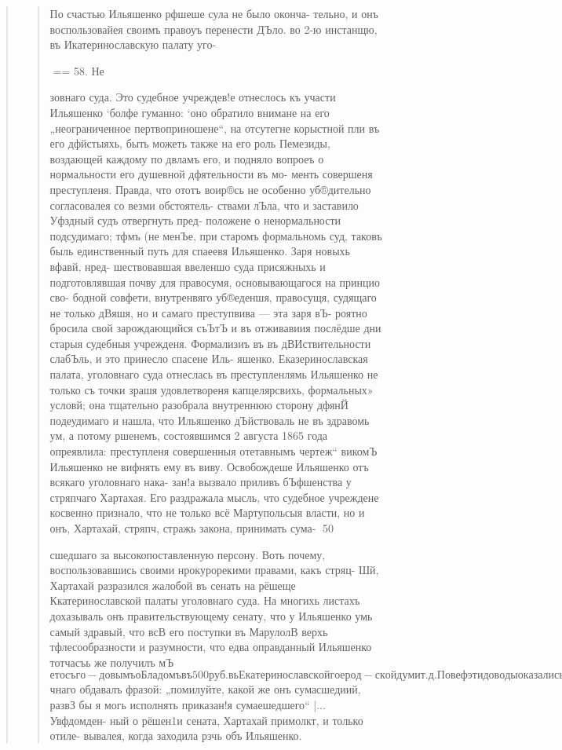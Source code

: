 \begin{quote}
\begin{quote}
По счастью Ильяшенко рфшеше сула не было оконча-
тельно, и онъ воспользовайея своимъ правоуъ перенести
ДЪло. во 2-ю инстанщю, въ Икатеринославскую палату уго-

== 58. Не

зовнаго суда. Это судебное учреждев!е отнеслось къ участи
Ильяшенко ‘болфе гуманно: ‘оно обратило внимане на его
„неограниченное пертвоприношене“, на отсутегне корыстной
пли въ его дфйстыяхь, быть можеть также на его роль
Пемезиды, воздающей каждому по двламъ его, и подняло
вопроеъ о нормальности его душевной дфятельности въ мо-
менть совершеня преступленя. Правда, что ототъ воир®сь
не особенно уб®дительно согласовалея со везми обстоятель-
ствами лЪла, что и заставило Уфздный судъ отвергнуть пред-
положене о ненормальности подсудимаго; тфмъ (не менЪе,
при старомъ формальномь суд, таковъ быль единственный
путь для спаеевя Ильяшенко. Заря новыхь вфавй, нред-
шествовавшая ввеленшо суда присяжныхь и подготовлявшая
почву для правосумя, основывающагося на принцио сво-
бодной совфети, внутренвяго уб®еденшя, правосущя, судящаго
не только дВяшя, но и самаго преступвива — эта заря вЪ-
роятно бросила свой зарождающийся съЪтЪ и въ отживавиия
послёдше дни старыя судебныя учрежденя. Формализиъ въ
въ дВИствительности слабЪль, и это принесло спасене Иль-
яшенко. Еказеринославская палата, уголовнаго суда отнеслась
въ преступленлямь Ильяшенко не только съ точки зрашя
удовлетвореня капцелярсвихь, формальных» условй; она
тщательно разобрала внутреннюю сторону дфянЙ подеудимаго
и нашла, что Ильяшенко дЪйствоваль не въ здравомь ум,
а потому ршенемъ, состоявшимся 2 августа 1865 года
опреявлила: преступленя совершенныя отетавнымъ чертеж“
викомЪ Ильяшенко не вифнять ему въ виву.
Освобождеше Ильяшенко отъ всякаго уголовнаго нака-
зан!а вызвало приливъ бЪфшенства у стряпчаго Хартахая.
Его раздражала мысль, что судебное учреждене косвенно
признало, что не только всё Мартупольсыя власти, но и
онъ, Хартахай, стряпч, стражь закона, принимать сума-
50

сшедшаго за высокопоставленную персону. Воть почему,
воспользовавшись своими нрокурорекими правами, какъ стряц-
Шй, Хартахай разразился жалобой въ сенать на рёшеще
Ккатеринославской палаты уголовнаго суда. На многихь
листахъ дохазываль онъ правительствующему сенату, что у
Ильяшенко умь самый здравый, что всВ его поступки въ
МарулолВ верхь тфлесообразности и разумности, что едва
оправданный Ильяшенко тотчасъь же получилъ мЪ$ето съ го-
довымъ оБладомъ въ 500 руб. вь Екатеринославской гоерод-
ской дум ит. д. По веф эти доводы оказались тщетнями:
сенатъ оставиль протесть Хартахая безь уваженя, удержавъ
съ него въ пользу казны 3 руб. 60 кон. пошлинъ за не-
правильную жалобу. (Л. д. 156—158 тамъ же). До рёшешя
сенала Хартахай очень горячо выражаль свое негодоваше
противь рЬшешя палаты и всакаго встр$чнаго обдавалъ
фразой: „помилуйте, какой же онъ сумасшедиий, развЗ бы
я могь исполнять приказан!я сумаешедшего“ |... Увфдомден-
ный о рёшен1и сената, Хартахай примолкт, и только отиле-
вывалея, когда заходила рзчь объ Ильяшенко.


\end{quote}
\end{quote}

